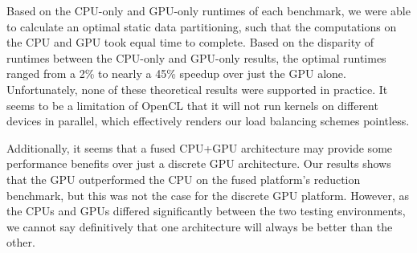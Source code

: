 \documentclass[journal]{IEEEtran}
\begin{document}
Based on the CPU-only and GPU-only runtimes of each benchmark, we were able to calculate an
optimal static data partitioning, such that the computations on the CPU and GPU took equal
time to complete.  Based on the disparity of runtimes between the CPU-only and GPU-only
results, the optimal runtimes ranged from a 2\% to nearly a 45\% speedup over just the GPU
alone.  Unfortunately, none of these theoretical results were supported in practice.  It seems
to be a limitation of OpenCL that it will not run kernels on different devices in parallel,
which effectively renders our load balancing schemes pointless.

Additionally, it seems that a fused CPU+GPU architecture may provide some performance benefits
over just a discrete GPU architecture.  Our results shows that the GPU outperformed the CPU on
the fused platform's reduction benchmark, but this was not the case for the discrete GPU platform.
However, as the CPUs and GPUs differed significantly between the two testing environments, we
cannot say definitively that one architecture will always be better than the other.
\end{document}
